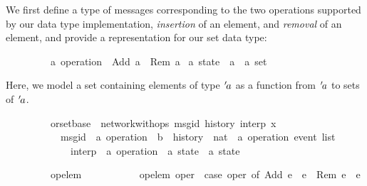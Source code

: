 We first define a type of messages corresponding to the two operations supported by our data type implementation, \emph{insertion} of an element, and \emph{removal} of an element, and provide a representation for our set data type:
\vspace{0.375em}
\begin{isabellebody}
\ \ \ \ \ \ \ \ \ {\isacharprime}a\ operation\ {\isacharequal}\ Add\ {\isacharprime}a\ {\isacharbar}\ Rem\ {\isacharprime}a
\quad\quad\quad\quad\quad\quad
{}\ {\isacharprime}a\ state\ {\isacharequal}\ {\isachardoublequoteopen}{\isacharprime}a\ {\isasymRightarrow}\ {\isacharprime}a\ set{\isachardoublequoteclose}
\end{isabellebody}
\vspace{0.375em}
Here, we model a set containing elements of type ${\emph{$\mskip2mu{'}\mskip-2mu$}}a$ as a function from ${\emph{$\mskip2mu{'}\mskip-2mu$}}a$ to sets of ${\emph{$\mskip2mu{'}\mskip-2mu$}}a$.

\begin{isabellebody}
\ \ \ \ \ \ \ \ \ orset{\isacharunderscore}base\ {\isacharequal}\ network{\isacharunderscore}with{\isacharunderscore}ops\ msg{\isacharunderscore}id\ history\ interp\ {\isachardoublequoteopen}{\isasymlambda}x{\isachardot}\ {\isacharbraceleft}{\isacharbraceright}{\isachardoublequoteclose}\isanewline
\ \ \ \ \ \ \ \ \ \ \ msg{\isacharunderscore}id\ {\isacharcolon}{\isacharcolon}\ {\isachardoublequoteopen}{\isacharprime}a\ operation\ {\isasymRightarrow}\ {\isacharprime}b{\isachardoublequoteclose}\ \ history\ {\isacharcolon}{\isacharcolon}\ {\isachardoublequoteopen}nat\ {\isasymRightarrow}\ {\isacharprime}a\ operation\ event\ list{\isachardoublequoteclose}\isanewline
\ \ \ \ \ \ \ \ \ \ \ \ \ interp\ {\isacharcolon}{\isacharcolon}\ {\isachardoublequoteopen}{\isacharprime}a\ operation\ {\isasymRightarrow}\ {\isacharprime}a\ state\ {\isasymrightharpoonup}\ {\isacharprime}a\ state{\isachardoublequoteclose}
\end{isabellebody}

\begin{isabellebody}
\ \ \ \ \ \ \ \ \ op{\isacharunderscore}elem\ \isanewline
\ \ \ \ \ \ \ \ \ \ {\isachardoublequoteopen}op{\isacharunderscore}elem\ oper\ {\isasymequiv}\ case\ oper\ of\ Add\ e\ {\isasymRightarrow}\ e\ {\isacharbar}\ Rem\ e\ {\isasymRightarrow}\ e{\isachardoublequoteclose}
\end{isabellebody}

